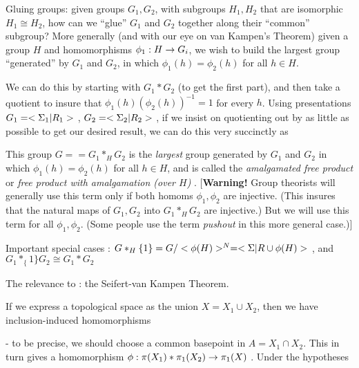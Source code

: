 \bsk



Gluing groups: given groups $G_1,G_2$, with subgroups $H_1,H_2$ that are
isomorphic $H_1\cong H_2$, how can we ``glue'' $G_1$ and $G_2$ together along their
``common'' subgroup? More generally (and with our eye on van Kampen's Theorem)
given a group $H$ and homomorphisms $\phi_1 : H\rightarrow G_i$, we wish to build the largest group ``generated'' by
$G_1$ and $G_2$, in which $\phi_1(h)=\phi_2(h)$ for all $h\in H$. 

\msk

We can do this by starting
with $G_1*G_2$ (to get the first part), and then take a quotient to insure that 
$\phi_1(h)(\phi_2(h))^{-1} =1$ for every $h$. Using presentations 
$G_1=<\Sigma_1 | R_1>$ , $G_2=<\Sigma_2 | R_2>$ , if we insist on quotienting out by 
as little as possible to get our desired result, we can do this very succinctly as

\msk

 
\msk

This group $G= =G_1*_HG_2$ is the {\it largest} group generated by $G_1$ and $G_2$ in which 
$\phi_1(h)=\phi_2(h)$ for all $h\in H$, and is called the {\it amalgamated 
free product} or {\it free product with amalgamation (over $H$)} . [{\bf Warning!} 
Group theorists will generally use this term only if both homoms $\phi_1,\phi_2$
are injective. (This insures that the natural maps of $G_1,G_2$ into $G_1*_HG_2$
are injective.) But we will use this term for all $\phi_1,\phi_2$. (Some people use the term {\it pushout}
in this more general case.)]

\msk

Important special cases : $G*_H\{1\} = G/<\phi(H)>^N = <\Sigma | R\cup \phi(H)>$ , and
$G_1*_\{1\}G_2 \cong G_1*G_2$

\bsk

The relevance to \mpu : the Seifert-van Kampen Theorem.

\msk

If we express a topological space as the union $X=X_1\cup X_2$, then we have 
inclusion-induced homomorphisms 


 - to be precise, we should choose a common basepoint in $A=X_1\cap X_2$. This 
in turn gives a homomorphism $\phi:\pi(X_1)*\pi_1(X_2)\rightarrow \pi_1(X)$ . Under the
hypotheses

